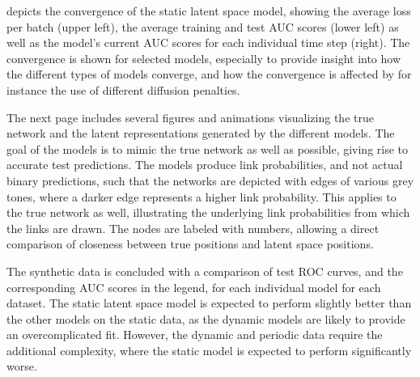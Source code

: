      depicts the convergence of the static latent space model, showing the average loss per batch (upper left), the average training and test AUC scores (lower left) as well as the model's current AUC scores for each individual time step (right). The convergence is shown for selected models, especially to provide insight into how the different types of models converge, and how the convergence is affected by for instance the use of different diffusion penalties.

    
    The next page includes several figures and animations visualizing the true network and the latent representations generated by the different models. The goal of the models is to mimic the true network as well as possible, giving rise to accurate test predictions. The models produce link probabilities, and not actual binary predictions, such that the networks are depicted with edges of various grey tones, where a darker edge represents a higher link probability. This applies to the true network as well, illustrating the underlying link probabilities from which the links are drawn. The nodes are labeled with numbers, allowing a direct comparison of closeness between true positions and latent space positions.
    
    The synthetic data is concluded with a comparison of test ROC curves, and the corresponding AUC scores in the legend, for each individual model for each dataset. The static latent space model is expected to perform slightly better than the other models on the static data, as the dynamic models are likely to provide an overcomplicated fit. However, the dynamic and periodic data require the additional complexity, where the static model is expected to perform significantly worse.
    


